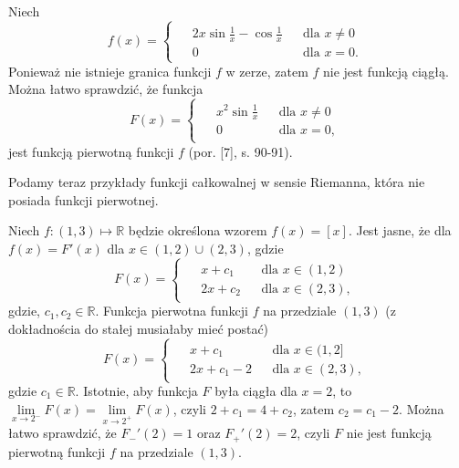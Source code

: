 \documentclass[leqno]{article}
\begin{document}
\begin{justify}
\begin{ex}
Niech
\[
f(x) =
\begin{cases}
    \begin{aligned}
        &2x\sin\frac{1}{x}-\cos{\frac{1}{x}} & &\text{dla } x \neq 0 \\
        &0                                   & &\text{dla } x = 0.
    \end{aligned}
\end{cases}
\]
Ponieważ nie istnieje granica funkcji $f$ w zerze, zatem $f$ nie jest funkcją ciągłą. Można łatwo sprawdzić, że funkcja 
\[
F(x) =
\begin{cases}
    \begin{aligned}
        &x^2\sin{\frac{1}{x}} & &\text{dla } x \neq 0 \\
        &0                                   & &\text{dla } x = 0,
    \end{aligned}
\end{cases}
\]
jest funkcją pierwotną funkcji $f$ (por. [7], s. 90-91).
\end{ex}

Podamy teraz przykłady funkcji całkowalnej w sensie Riemanna, która nie posiada funkcji pierwotnej.

\begin{ex}
    Niech $f : (1,3) \mapsto \mathbb{R}$ będzie określona wzorem $f(x) = [x]$.
    Jest jasne, że dla $f(x) = F'(x)$ dla $x \in (1,2) \cup (2,3)$, gdzie
    \[
    F(x) =
        \begin{cases}
            \begin{aligned}
                &x + c_1 & &\text{dla } x \in (1,2) \\
                &2x + c_2                                 & &\text{dla } x \in (2,3),
            \end{aligned}
        \end{cases}
    \]
    gdzie, $c_1, c_2 \in \mathbb{R}$. Funkcja pierwotna funkcji $f$ na przedziale $(1,3)$ 
    (z dokładnościa do stałej musiałaby mieć postać)
    \[
    F(x) =
        \begin{cases}
            \begin{aligned}
                &x + c_1 & &\text{dla } x \in (1,2] \\
                &2x + c_1 - 2 & &\text{dla } x \in (2,3),
            \end{aligned}
        \end{cases}
    \]
    gdzie $c_1 \in \mathbb{R}$. Istotnie, aby funkcja $F$ była ciągła dla $x = 2$, to 
    $\lim\limits_{x\to2^-}F(x) = \lim\limits_{x\to2^+}F(x)$, czyli $2 + c_1 = 4 + c_2$, zatem $c_2 = c_1 - 2$. 
    Można łatwo sprawdzić, że $F_{-}'(2) = 1$ oraz $F_{+}'(2) = 2$, czyli $F$ nie jest
    funkcją pierwotną funkcji $f$ na przedziale $(1,3)$.
\end{ex}


\end{justify}
\end{document}
